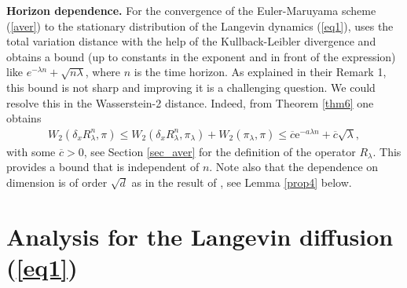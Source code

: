 \documentclass[a4paper]{article}
\def\e{\text{e}}
\def\Rl{R_{\lambda}}
\begin{document}
\textbf{Horizon dependence.} For the convergence of the Euler-Maruyama scheme (\ref{aver}) to the stationary distribution of the Langevin dynamics (\ref{eq1}), \cite{dalalyan} uses the total variation distance with the help of the Kullback-Leibler divergence and obtains a bound (up to constants in the exponent and
in front of the expression) like $e^{-\lambda n} + \sqrt{n\lambda}$, where $n$ is the time horizon. As explained in their Remark 1, this bound is not sharp and improving it is a challenging question. We could resolve this in the Wasserstein-2 distance. Indeed, from Theorem \ref{thm6} one obtains
\begin{align}
W_2(\delta_x \Rl^n,\pi) \leq W_2(\delta_x \Rl^n,\pi_{\lambda})+W_2(\pi_{\lambda},\pi)\leq \overline{c} \e^{-a\lambda n}+\overline{c} \sqrt{\lambda},
\end{align}
with some $\overline{c}>0$, see Section \ref{sec_aver} for the definition of
the operator $R_{\lambda}$. This provides a bound that is independent of $n$. Note also that the dependence on dimension is of order $\sqrt{d}$ as in the result of \cite{dalalyan}, see Lemma \ref{prop4} below.

\section{Analysis for the Langevin diffusion (\ref{eq1})}\label{sec_langevin}
\end{document}
